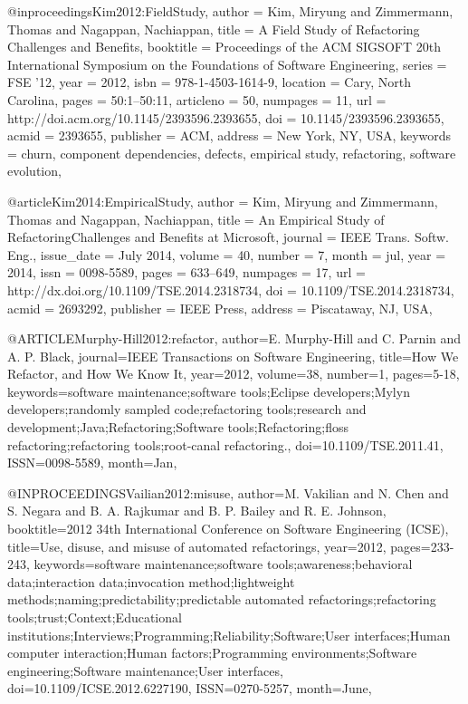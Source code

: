 \documentclass[runningheads,a4paper]{llncs}
\begin{document}
@inproceedings{Kim2012:FieldStudy, 
 author = {Kim, Miryung and Zimmermann, Thomas and Nagappan, Nachiappan},
 title = {A Field Study of Refactoring Challenges and Benefits},
 booktitle = {Proceedings of the ACM SIGSOFT 20th International Symposium on the Foundations of Software Engineering},
 series = {FSE '12},
 year = {2012},
 isbn = {978-1-4503-1614-9},
 location = {Cary, North Carolina},
 pages = {50:1--50:11},
 articleno = {50},
 numpages = {11},
 url = {http://doi.acm.org/10.1145/2393596.2393655},
 doi = {10.1145/2393596.2393655},
 acmid = {2393655},
 publisher = {ACM},
 address = {New York, NY, USA},
 keywords = {churn, component dependencies, defects, empirical study, refactoring, software evolution},
}

@article{Kim2014:EmpiricalStudy, 
 author = {Kim, Miryung and Zimmermann, Thomas and Nagappan, Nachiappan},
 title = {An Empirical Study of RefactoringChallenges and Benefits at Microsoft},
 journal = {IEEE Trans. Softw. Eng.},
 issue_date = {July 2014},
 volume = {40},
 number = {7},
 month = jul,
 year = {2014},
 issn = {0098-5589},
 pages = {633--649},
 numpages = {17},
 url = {http://dx.doi.org/10.1109/TSE.2014.2318734},
 doi = {10.1109/TSE.2014.2318734},
 acmid = {2693292},
 publisher = {IEEE Press},
 address = {Piscataway, NJ, USA},
} 


@ARTICLE{Murphy-Hill2012:refactor, 
author={E. Murphy-Hill and C. Parnin and A. P. Black}, 
journal={IEEE Transactions on Software Engineering}, 
title={How We Refactor, and How We Know It}, 
year={2012}, 
volume={38}, 
number={1}, 
pages={5-18}, 
keywords={software maintenance;software tools;Eclipse developers;Mylyn developers;randomly sampled code;refactoring tools;research and development;Java;Refactoring;Software tools;Refactoring;floss refactoring;refactoring tools;root-canal refactoring.}, 
doi={10.1109/TSE.2011.41}, 
ISSN={0098-5589}, 
month={Jan},}

@INPROCEEDINGS{Vailian2012:misuse, 
author={M. Vakilian and N. Chen and S. Negara and B. A. Rajkumar and B. P. Bailey and R. E. Johnson}, 
booktitle={2012 34th International Conference on Software Engineering (ICSE)}, 
title={Use, disuse, and misuse of automated refactorings}, 
year={2012}, 
pages={233-243}, 
keywords={software maintenance;software tools;awareness;behavioral data;interaction data;invocation method;lightweight methods;naming;predictability;predictable automated refactorings;refactoring tools;trust;Context;Educational institutions;Interviews;Programming;Reliability;Software;User interfaces;Human computer interaction;Human factors;Programming environments;Software engineering;Software maintenance;User interfaces}, 
doi={10.1109/ICSE.2012.6227190}, 
ISSN={0270-5257}, 
month={June},}
\end{document}

